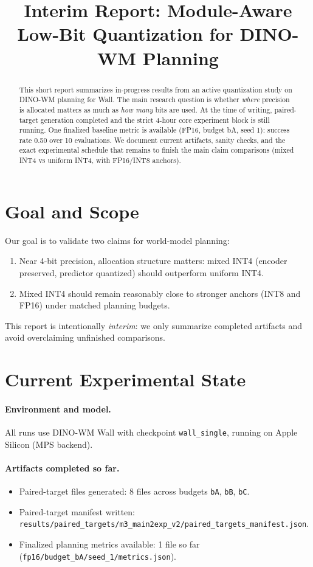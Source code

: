 \documentclass{article}
\title{Interim Report: Module-Aware Low-Bit Quantization for DINO-WM Planning}
\author{}
\begin{document}
\maketitle
{}

\begin{abstract}
This short report summarizes in-progress results from an active quantization study on DINO-WM planning for Wall.
The main research question is whether \emph{where} precision is allocated matters as much as \emph{how many} bits are used.
At the time of writing, paired-target generation completed and the strict 4-hour core experiment block is still running.
One finalized baseline metric is available (FP16, budget bA, seed 1): success rate 0.50 over 10 evaluations.
We document current artifacts, sanity checks, and the exact experimental schedule that remains to finish the main claim comparisons (mixed INT4 vs uniform INT4, with FP16/INT8 anchors).
\end{abstract}

\section{Goal and Scope}
Our goal is to validate two claims for world-model planning:
\begin{enumerate}
  \item Near 4-bit precision, allocation structure matters: mixed INT4 (encoder preserved, predictor quantized) should outperform uniform INT4.
  \item Mixed INT4 should remain reasonably close to stronger anchors (INT8 and FP16) under matched planning budgets.
\end{enumerate}

This report is intentionally \emph{interim}: we only summarize completed artifacts and avoid overclaiming unfinished comparisons.

\section{Current Experimental State}
\paragraph{Environment and model.}
All runs use DINO-WM Wall with checkpoint \texttt{wall\_single}, running on Apple Silicon (MPS backend).

\paragraph{Artifacts completed so far.}
\begin{itemize}
  \item Paired-target files generated: 8 files across budgets \texttt{bA}, \texttt{bB}, \texttt{bC}.
  \item Paired-target manifest written:
  \texttt{results/paired\_targets/m3\_main2exp\_v2/paired\_targets\_manifest.json}.
  \item Finalized planning metrics available: 1 file so far
  (\texttt{fp16/budget\_bA/seed\_1/metrics.json}).
\end{itemize}
\end{document}
